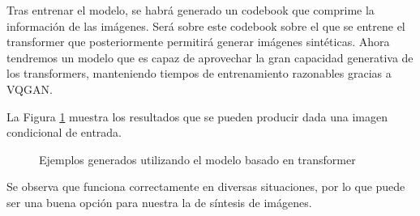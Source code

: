Tras entrenar el modelo, se habrá generado un codebook que comprime la información de las imágenes. Será sobre este codebook sobre el que se entrene el transformer que posteriormente permitirá generar imágenes sintéticas. Ahora tendremos un modelo que es capaz de aprovechar la gran capacidad generativa de los transformers, manteniendo tiempos de entrenamiento razonables gracias a VQGAN.

La Figura \ref{fig:taming-examples} muestra los resultados que se pueden producir dada una imagen condicional de entrada.

\begin{figure}[H]
\centering
    \caption{Ejemplos generados utilizando el modelo basado en transformer \cite{esser2021taming}}
    \label{fig:taming-examples}
\end{figure}

Se observa que funciona correctamente en diversas situaciones, por lo que puede ser una buena opción para nuestra la de síntesis de imágenes.

